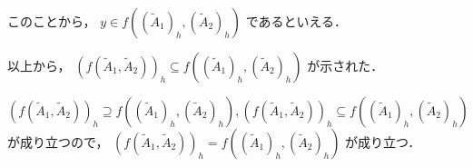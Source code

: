 \documentclass[uplatex, a4j, 10pt, fleqn, dvipdfmx]{article}
\begin{document}
\noindent
このことから， $y \in f \left( ( \tilde{A}_1 )_h, ( \tilde{A}_2 )_h \right)$ であるといえる．

\noindent
以上から， $\left( f \left( \tilde{A}_1, \tilde{A}_2 \right) \right)_h \subseteq
	f \left( ( \tilde{A}_1 )_h, ( \tilde{A}_2 )_h \right)$ が示された．

\noindent
$\left( f \left( \tilde{A}_1, \tilde{A}_2 \right) \right)_h \supseteq
	f \left( ( \tilde{A}_1 )_h, ( \tilde{A}_2 )_h \right), \left( f \left( \tilde{A}_1, \tilde{A}_2 \right) \right)_h \subseteq
	f \left( ( \tilde{A}_1 )_h, ( \tilde{A}_2 )_h \right)$ が成り立つので， $\left( f \left( \tilde{A}_1, \tilde{A}_2 \right) \right)_h =
	f \left( ( \tilde{A}_1 )_h, ( \tilde{A}_2 )_h \right)$ が成り立つ．

\end{document}
